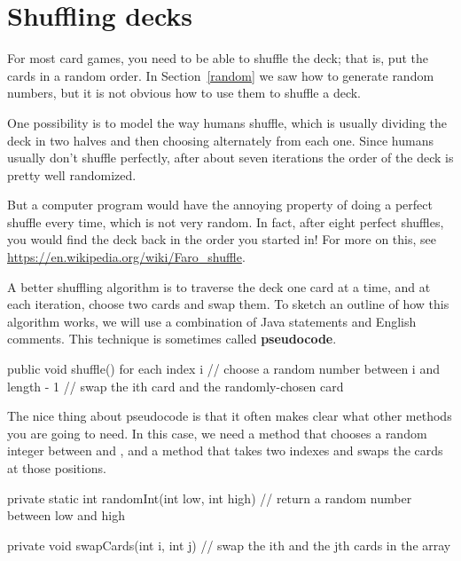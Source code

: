 \section{Shuffling decks}
\label{shuffle}


For most card games, you need to be able to shuffle the deck; that is, put the cards in a random order.
In Section~\ref{random} we saw how to generate random numbers, but it is not obvious how to use them to shuffle a deck.

One possibility is to model the way humans shuffle, which is usually dividing the deck in two halves and then choosing alternately from each one.
Since humans usually don't shuffle perfectly, after about seven iterations the order of the deck is pretty well randomized.

But a computer program would have the annoying property of doing a perfect shuffle every time, which is not very random.
In fact, after eight perfect shuffles, you would find the deck back in the order you started in!
For more on this, see \url{https://en.wikipedia.org/wiki/Faro_shuffle}.


A better shuffling algorithm is to traverse the deck one card at a time, and at each iteration, choose two cards and swap them.
To sketch an outline of how this algorithm works, we will use a combination of Java statements and English comments.
This technique is sometimes called {\bf pseudocode}.


\begin{code}
public void shuffle() {
    for each index i {
        // choose a random number between i and length - 1
        // swap the ith card and the randomly-chosen card
    }
}
\end{code}


The nice thing about pseudocode is that it often makes clear what other methods you are going to need.
In this case, we need a method that chooses a random integer between  and , and a method that takes two indexes and swaps the cards at those positions.

\begin{code}
private static int randomInt(int low, int high) {
    // return a random number between low and high
}

private void swapCards(int i, int j) {
    // swap the ith and the jth cards in the array
}
\end{code}


